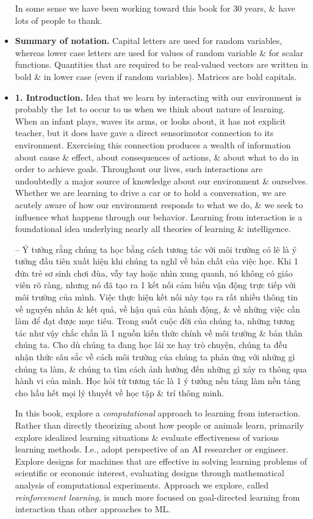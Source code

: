 \documentclass{article}
\begin{document}
\begin{itemize}
    In some sense we have been working toward this book for 30 years, \& have lots of people to thank.
    \item {\bf Summary of notation.} Capital letters are used for random variables, whereas lower case letters are used for values of random variable \& for scalar functions. Quantities that are required to be real-valued vectors are written in bold \& in lower case (even if random variables). Matrices are bold capitals.
    \item {\bf1. Introduction.} Idea that we learn by interacting with our environment is probably the 1st to occur to us when we think about nature of learning. When an infant plays, waves its arms, or looks about, it has not explicit teacher, but it does have gave a direct sensorimotor connection to its environment. Exercising this connection produces a wealth of information about cause \& effect, about consequences of actions, \& about what to do in order to achieve goals. Throughout our lives, such interactions are undoubtedly a major source of knowledge about our environment \& ourselves. Whether we are learning to drive a car or to hold a conversation, we are acutely aware of how our environment responds to what we do, \& we seek to influence what happens through our behavior. Learning from interaction is a foundational idea underlying nearly all theories of learning \& intelligence.

    -- Ý tưởng rằng chúng ta học bằng cách tương tác với môi trường có lẽ là ý tưởng đầu tiên xuất hiện khi chúng ta nghĩ về bản chất của việc học. Khi 1 đứa trẻ sơ sinh chơi đùa, vẫy tay hoặc nhìn xung quanh, nó không có giáo viên rõ ràng, nhưng nó đã tạo ra 1 kết nối cảm biến vận động trực tiếp với môi trường của mình. Việc thực hiện kết nối này tạo ra rất nhiều thông tin về nguyên nhân \& kết quả, về hậu quả của hành động, \& về những việc cần làm để đạt được mục tiêu. Trong suốt cuộc đời của chúng ta, những tương tác như vậy chắc chắn là 1 nguồn kiến thức chính về môi trường \& bản thân chúng ta. Cho dù chúng ta đang học lái xe hay trò chuyện, chúng ta đều nhận thức sâu sắc về cách môi trường của chúng ta phản ứng với những gì chúng ta làm, \& chúng ta tìm cách ảnh hưởng đến những gì xảy ra thông qua hành vi của mình. Học hỏi từ tương tác là 1 ý tưởng nền tảng làm nền tảng cho hầu hết mọi lý thuyết về học tập \& trí thông minh.

    In this book, explore a {\it computational} approach to learning from interaction. Rather than directly theorizing about how people or animals learn, primarily explore idealized learning situations \& evaluate effectiveness of various learning methods. I.e., adopt perspective of an AI researcher or engineer. Explore designs for machines that are effective in solving learning problems of scientific or economic interest, evaluating designs through mathematical analysis of computational experiments. Approach we explore, called {\it reinforcement learning}, is much more focused on goal-directed learning from interaction than other approaches to ML.


\end{itemize}
\end{document}
